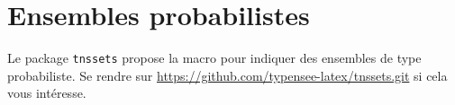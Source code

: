 \documentclass[12pt,a4paper]{article}
\begin{document}
\section{Ensembles probabilistes}

Le package \verb+tnssets+ propose la macro  pour indiquer des ensembles de type probabiliste.
Se rendre sur \url{https://github.com/typensee-latex/tnssets.git} si cela vous intéresse. 
\end{document}
